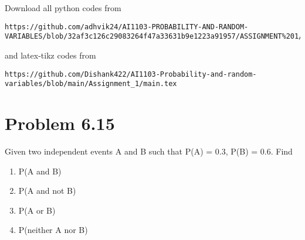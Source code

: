 \documentclass[journal,12pt,twocolumn]{IEEEtran}
\begin{document}
\maketitle
\newpage
\bigskip
\renewcommand{\thefigure}{\theenumi}
\renewcommand{\thetable}{\theenumi}
Download all python codes from 
\begin{lstlisting}
https://github.com/adhvik24/AI1103-PROBABILITY-AND-RANDOM-VARIABLES/blob/32af3c126c29083264f47a33631b9e1223a91957/ASSIGNMENT%201/codes/assign1.py
\end{lstlisting}
%
and latex-tikz codes from 
%
\begin{lstlisting}
https://github.com/Dishank422/AI1103-Probability-and-random-variables/blob/main/Assignment_1/main.tex
\end{lstlisting}
\section{Problem 6.15}
Given two independent events A and B such
that P(A) = 0.3, P(B) = 0.6. Find
\begin{enumerate}[label={\roman*)}]
    \item P(A and B)
    \item P(A and not B)
    \item P(A or B)
    \item P(neither A nor B)
\end{enumerate}
\end{document}
